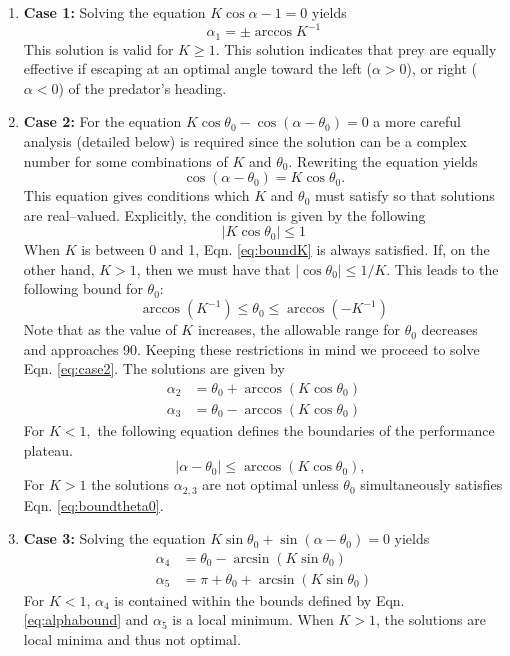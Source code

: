 \documentclass[12pt]{article}
\begin{document}
\begin{enumerate}
\item[]{\bf Case 1:} Solving the equation $K \cos \alpha - 1 = 0$ yields
\begin{equation*}
\alpha_1 = \pm \arccos K^{-1}
\end{equation*}
This solution is valid for $K\geq1.$ This solution indicates that prey are equally effective if escaping at an optimal angle toward the left ($\alpha>0$), or right ($\alpha<0$) of the predator's heading. 

\item[]{\bf Case 2:} For the equation $K\cos \theta_0 - \cos(\alpha - \theta_0) = 0$ a more careful analysis (detailed below) is required since the solution can be a complex number for some combinations of $K$ and $\theta_0.$ Rewriting the equation yields 
%
\begin{equation}
\cos(\alpha - \theta_0) = K\cos \theta_0.
\label{eq:case2}
\end{equation}
%
This equation gives conditions which $K$ and $\theta_0$ must satisfy so that solutions are real--valued. Explicitly, the condition is given by the following
%
\begin{equation}
 | K\cos \theta_0 | \leq 1
 \label{eq:boundK}
\end{equation}
%
When $K$ is between 0 and 1, Eqn. \ref{eq:boundK} is always satisfied. If, on the other hand, $K > 1$, then we must have that $| \cos \theta_0| \leq 1/K.$ This leads to the following bound for $\theta_0$:
%
\begin{equation}
\arccos (K^{-1}) \leq \theta_0 \leq \arccos (-K^{-1})
\label{eq:boundtheta0}
\end{equation}
%
Note that as the value of $K$ increases, the allowable range for $\theta_0$ decreases and approaches 90\textdegree. Keeping these restrictions in mind we proceed to solve Eqn. \ref{eq:case2}. The solutions are given by
\begin{align*}
\alpha_2 & = \theta_0 + \arccos(K \cos \theta_0) \\
\alpha_3 & = \theta_0 - \arccos(K \cos \theta_0)
\end{align*}
For $K<1,$ the following equation defines the boundaries of the performance plateau. 
%
\begin{equation}
\quad |\alpha - \theta_0|  \leq    \arccos(K \cos  \theta_0) ,
 \end{equation}
%
For $K>1$ the solutions $\alpha_{2,3}$ are not optimal unless $\theta_0$ simultaneously satisfies Eqn. \ref{eq:boundtheta0}. 

\item[]{\bf Case 3:} Solving the equation $K\sin \theta_0 + \sin(\alpha -\theta_0) = 0$ yields
\begin{align*}
\alpha_4 & = \theta_0 - \arcsin(K \sin \theta_0) \\
\alpha_5 & = \pi + \theta_0 + \arcsin(K \sin \theta_0)
\end{align*}
For $K<1$, $\alpha_4$ is contained within the bounds defined by Eqn. \ref{eq:alphabound} and $\alpha_5$ is a local minimum. When $K>1$, the solutions are local minima and thus not optimal.     
\end{enumerate}
\end{document}
